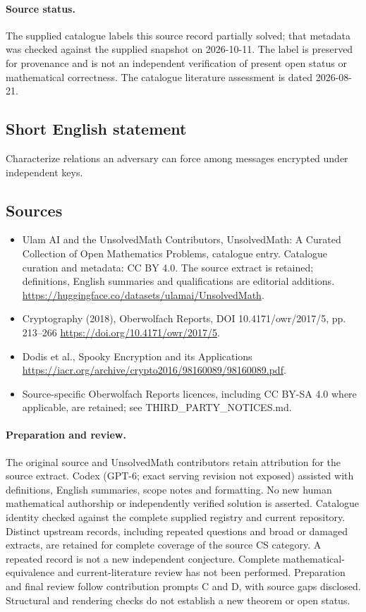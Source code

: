 \documentclass[11pt]{article}
\begin{document}
\paragraph{Source status.}
The supplied catalogue labels this source record partially solved; that metadata was checked against the supplied snapshot on 2026-10-11. The label is preserved for provenance and is not an independent verification of present open status or mathematical correctness. The catalogue literature assessment is dated 2026-08-21.
\subsection{Short English statement}
Characterize relations an adversary can force among messages encrypted under independent keys.
\subsection{Sources}
\begin{itemize}
\item[S1] Ulam AI and the UnsolvedMath Contributors, UnsolvedMath: A Curated Collection of Open Mathematics Problems, catalogue entry. Catalogue curation and metadata: CC BY 4.0. The source extract is retained; definitions, English summaries and qualifications are editorial additions.
\url{https://huggingface.co/datasets/ulamai/UnsolvedMath}.
\item[S2] Cryptography (2018), Oberwolfach Reports, DOI 10.4171/owr/2017/5, pp. 213--266
\url{https://doi.org/10.4171/owr/2017/5}.
\item[S3] Dodis et al., Spooky Encryption and its Applications
\url{https://iacr.org/archive/crypto2016/98160089/98160089.pdf}.
\item Source-specific Oberwolfach Reports licences, including CC BY-SA 4.0 where applicable, are retained; see THIRD\_PARTY\_NOTICES.md.
\end{itemize}
\paragraph{Preparation and review.}
The original source and UnsolvedMath contributors retain attribution for the source extract. Codex (GPT-6; exact serving revision not exposed) assisted with definitions, English summaries, scope notes and formatting. No new human mathematical authorship or independently verified solution is asserted. Catalogue identity checked against the complete supplied registry and current repository. Distinct upstream records, including repeated questions and broad or damaged extracts, are retained for complete coverage of the source CS category. A repeated record is not a new independent conjecture. Complete mathematical-equivalence and current-literature review has not been performed. Preparation and final review follow contribution prompts C and D, with source gaps disclosed. Structural and rendering checks do not establish a new theorem or open status.
\label{end:statement}
\end{document}
